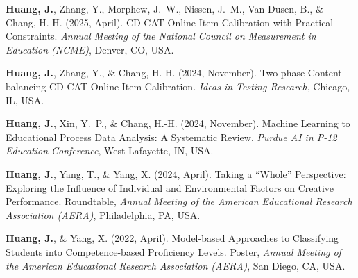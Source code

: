 \documentclass[10.5pt,letterpaper]{article}
\newcommand{\me}[1]{\textbf{#1}}   %
\begin{document}
\begin{pubs}
\item \me{Huang, J.}, Zhang, Y., Morphew, J.~W., Nissen, J.~M., Van Dusen, B., \& Chang, H.-H. (2025, April). CD-CAT Online Item Calibration with Practical Constraints. \textit{Annual Meeting of the National Council on Measurement in Education (NCME)}, Denver, CO, USA.
\item \me{Huang, J.}, Zhang, Y., \& Chang, H.-H. (2024, November). Two-phase Content-balancing CD-CAT Online Item Calibration. \textit{Ideas in Testing Research}, Chicago, IL, USA.
\item \me{Huang, J.}, Xin, Y.~P., \& Chang, H.-H. (2024, November). Machine Learning to Educational Process Data Analysis: A Systematic Review. \textit{Purdue AI in P-12 Education Conference}, West Lafayette, IN, USA.
\item \me{Huang, J.}, Yang, T., \& Yang, X. (2024, April). Taking a ``Whole'' Perspective: Exploring the Influence of Individual and Environmental Factors on Creative Performance. Roundtable, \textit{Annual Meeting of the American Educational Research Association (AERA)}, Philadelphia, PA, USA.
\item \me{Huang, J.}, \& Yang, X. (2022, April). Model-based Approaches to Classifying Students into Competence-based Proficiency Levels. Poster, \textit{Annual Meeting of the American Educational Research Association (AERA)}, San Diego, CA, USA.
\end{pubs}

\end{document}
